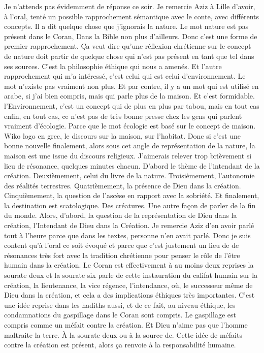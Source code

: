 Je n'attends pas évidemment de réponse ce soir. Je remercie Aziz à Lille d'avoir, à l'oral, tenté un possible rapprochement sémantique avec le conte, avec différents concepts. Il a dit quelque chose que j'ignorais la nature. Le mot nature est pas présent dans le Coran, Dans la Bible non plus d'ailleurs. Donc c'est une forme de premier rapprochement. Ça veut dire qu'une réflexion chrétienne sur le concept de nature doit partir de quelque chose qui n'est pas présent en tant que tel dans ses sources.
C'est la philosophie éthique qui nous a amenés. Et l'autre rapprochement qui m'a intéressé, c'est celui qui est celui d'environnement. Le mot n'existe pas vraiment non plus. Et par contre, il y a un mot qui est utilisé en arabe, si j'ai bien compris, mais qui parle plus de la maison. Et c'est formidable. l'Environnement, c'est un concept qui de plus en plus par tabou, mais en tout cas enfin, en tout cas, ce n'est pas de très bonne presse chez les gens qui parlent vraiment d'écologie.
Parce que le mot écologie est basé sur le concept de maison. Wiko logo en grec, le discours sur la maison, sur l'habitat. Donc si c'est une bonne nouvelle finalement, alors sous cet angle de représentation de la nature, la maison est une issue du discours religieux. J'aimerais relever trop brièvement si lieu de résonance, quelques minutes chacun. D'abord le thème de l'intendant de la création.
Deuxièmement, celui du livre de la nature. Troisièmement, l'autonomie des réalités terrestres. Quatrièmement, la présence de Dieu dans la création. Cinquièmement, la question de l'ascèse en rapport avec la sobriété. Et finalement, la destination est scatologique. Des créatures. Une autre façon de parler de la fin du monde. Alors, d'abord, la question de la représentation de Dieu dans la création, l'Intendant de Dieu dans la Création.
Je remercie Aziz d'en avoir parlé tout à l'heure parce que dans les textes, personne n'en avait parlé. Donc je suis content qu'à l'oral ce soit évoqué et parce que c'est justement un lieu de de résonances très fort avec la tradition chrétienne pour penser le rôle de l'être humain dans la création. Le Coran est effectivement à au moins deux reprises la sourate deux et la sourate six parle de cette instauration du califat humain sur la création, la lieutenance, la vice régence, l'intendance, où, le successeur même de Dieu dans la création, et cela a des implications éthiques très importantes.
C'est une idée reprise dans les hadiths aussi, et de ce fait, au niveau éthique, les condamnations du gaspillage dans le Coran sont compris. Le gaspillage est compris comme un méfait contre la création. Et Dieu n'aime pas que l'homme maltraite la terre. À la sourate deux ou à la source de. Cette idée de méfaits contre la création est présent, alors ça renvoie à la responsabilité humaine.
